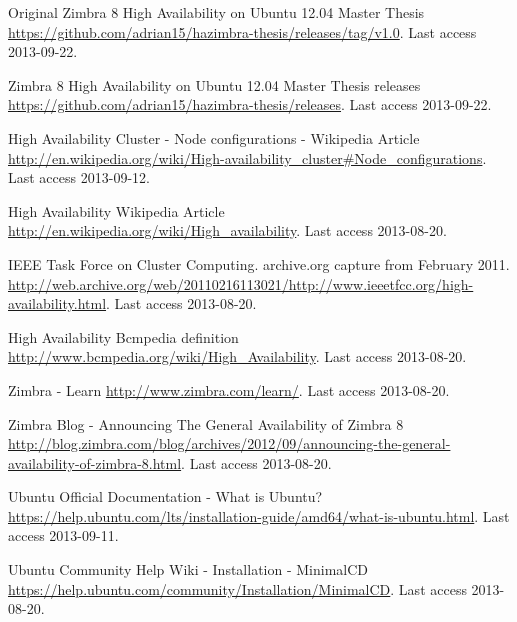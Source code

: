 
\begin{thebibliography}{1}


 Original Zimbra 8 High Availability on Ubuntu 12.04 Master Thesis
\url{https://github.com/adrian15/hazimbra-thesis/releases/tag/v1.0}. Last access 2013-09-22.

 Zimbra 8 High Availability on Ubuntu 12.04 Master Thesis releases
\url{https://github.com/adrian15/hazimbra-thesis/releases}. Last access 2013-09-22.



 High Availability Cluster - Node configurations - Wikipedia Article
\url{http://en.wikipedia.org/wiki/High-availability_cluster#Node_configurations}. Last access 2013-09-12.


 High Availability Wikipedia Article
\url{http://en.wikipedia.org/wiki/High_availability}. Last access 2013-08-20.

 IEEE Task Force on Cluster Computing. archive.org capture from February 2011.
\url{http://web.archive.org/web/20110216113021/http://www.ieeetfcc.org/high-availability.html}. Last access 2013-08-20.

 High Availability Bcmpedia definition
\url{http://www.bcmpedia.org/wiki/High_Availability}. Last access 2013-08-20.

 Zimbra - Learn
\url{http://www.zimbra.com/learn/}. Last access 2013-08-20.

 Zimbra Blog - Announcing The General Availability of Zimbra 8
\url{http://blog.zimbra.com/blog/archives/2012/09/announcing-the-general-availability-of-zimbra-8.html}. Last access 2013-08-20.


 Ubuntu Official Documentation - What is Ubuntu?
\url{https://help.ubuntu.com/lts/installation-guide/amd64/what-is-ubuntu.html}. Last access 2013-09-11.

 Ubuntu Community Help Wiki - Installation - MinimalCD
\url{https://help.ubuntu.com/community/Installation/MinimalCD}. Last access 2013-08-20.


\end{thebibliography}
